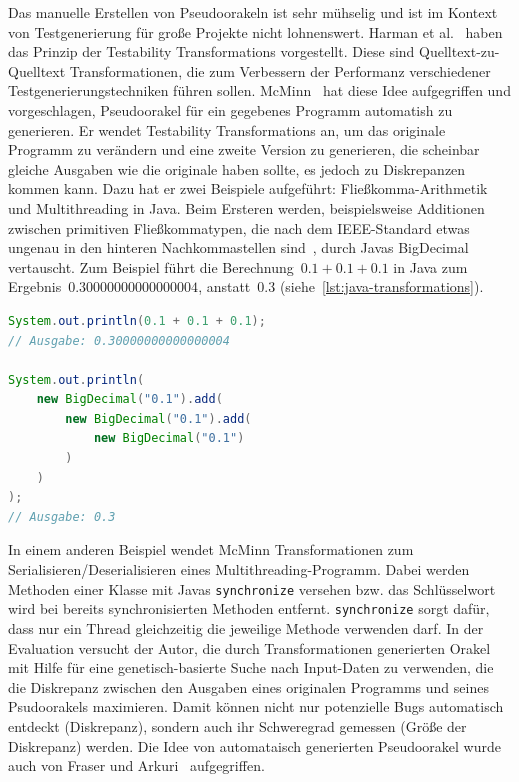 \documentclass{article}
\begin{document}
Das manuelle Erstellen von Pseudoorakeln ist sehr mühselig und ist im Kontext von Testgenerierung für große Projekte nicht lohnenswert. Harman et al.~\cite{Harman2004} haben das Prinzip der Testability Transformations vorgestellt. Diese sind Quelltext-zu-Quelltext Transformationen, die zum Verbessern der Performanz verschiedener Testgenerierungstechniken führen sollen. McMinn~\cite{McMinn2009} hat diese Idee aufgegriffen und vorgeschlagen, Pseudoorakel für ein gegebenes Programm automatish zu generieren. Er wendet Testability Transformations an, um das originale Programm zu verändern und eine zweite Version zu generieren, die scheinbar gleiche Ausgaben wie die originale haben sollte, es jedoch zu Diskrepanzen kommen kann. Dazu hat er zwei Beispiele aufgeführt: Fließkomma-Arithmetik und Multithreading in Java. Beim Ersteren werden, beispielsweise Additionen zwischen primitiven Fließkommatypen, die nach dem IEEE-Standard etwas ungenau in den hinteren Nachkommastellen sind~\cite{10.1145/103162.103163}, durch Javas BigDecimal vertauscht. Zum Beispiel führt die Berechnung~$0.1 + 0.1 + 0.1$ in Java zum Ergebnis~$0.30000000000000004$, anstatt~$0.3$ (siehe~\cref{lst:java-transformations}).

\begin{lstlisting}[language=Java, caption=Comparing floating-point arithmetic in Java using double compared to BigDecimal~\cite{McMinn2009}, label=lst:java-transformations]
System.out.println(0.1 + 0.1 + 0.1);
// Ausgabe: 0.30000000000000004

System.out.println(
    new BigDecimal("0.1").add(
        new BigDecimal("0.1").add(
            new BigDecimal("0.1")
        )
    )
);
// Ausgabe: 0.3
\end{lstlisting}
In einem anderen Beispiel wendet McMinn Transformationen zum Serialisieren/Deserialisieren eines Multithreading-Programm. Dabei werden Methoden einer Klasse mit Javas \lstinline{synchronize} versehen bzw. das Schlüsselwort wird bei bereits synchronisierten Methoden entfernt. \lstinline{synchronize} sorgt dafür, dass nur ein Thread gleichzeitig die jeweilige Methode verwenden darf. In der Evaluation versucht der Autor, die durch Transformationen generierten Orakel mit Hilfe für eine genetisch-basierte Suche nach Input-Daten zu verwenden, die die Diskrepanz zwischen den Ausgaben eines originalen Programms und seines Psudoorakels maximieren. Damit können nicht nur potenzielle Bugs automatisch entdeckt (Diskrepanz), sondern auch ihr Schweregrad gemessen (Größe der Diskrepanz) werden. Die Idee von automataisch generierten Pseudoorakel wurde auch von Fraser und Arkuri~\cite{Fraser_2013} aufgegriffen. 
\end{document}

